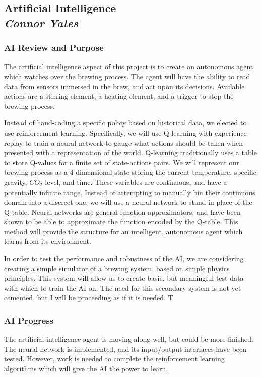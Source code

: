 \documentclass[draftclsnofoot,onecolumn,letterpaper,10pt]{IEEEtran}
\begin{document}
\subsection{Artificial Intelligence\\{\em\textbf{Connor Yates}}}
\subsubsection{AI Review and Purpose}
The artificial intelligence aspect of this project is to create an autonomous agent which watches over the brewing process.
The agent will have the ability to read data from sensors immersed in the brew, and act upon its decisions.
Available actions are a stirring element, a heating element, and a trigger to stop the brewing process.

Instead of hand-coding a specific policy based on historical data, we elected to use reinforcement learning.
Specifically, we will use Q-learning with experience replay to train a neural network to gauge what actions should be taken when presented with a representation of the world.
Q-learning traditionally uses a table to store Q-values for a finite set of state-actions pairs.
We will represent our brewing process as a 4-dimensional state storing the current temperature, specific gravity, $CO_2$ level, and time.
These variables are continuous, and have a potentially infinite range.
Instead of attempting to manually bin their continuous domain into a discreet one, we will use a neural network to stand in place of the Q-table.
Neural networks are general function approximators, and have been shown to be able to approximate the function encoded by the Q-table.
This method will provide the structure for an intelligent, autonomous agent which learns from its environment.

In order to test the performance and robustness of the AI, we are considering creating a simple simulator of a brewing system, based on simple physics principles.
This system will allow us to create basic, but meaningful test data with which to train the AI on.
The need for this secondary system is not yet cemented, but I will be proceeding as if it is needed.
T


\subsubsection{AI Progress}
The artificial intelligence agent is moving along well, but could be more finished.
The neural network is implemented, and its input/output interfaces have been tested.
However, work is needed to complete the reinforcement learning algorithms which will give the AI the power to learn.
\end{document}
